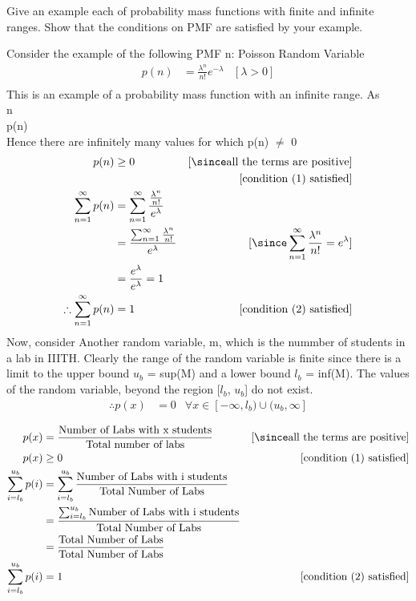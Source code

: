 \begin{Problem}
Give an example each of probability mass functions with finite and infinite ranges. Show that the conditions on PMF are satisfied by your example.
\end{Problem}
\begin{Solution}
Consider the example of the following PMF n: Poisson Random Variable\\
\begin{align*}
    p(n) &= \frac{\lambda^n}{n!}e^{-\lambda} &[\lambda > 0]\\
\end{align*}
This is an example of a probability mass function with an infinite range. As \\ n \rightarrow \infty \\p(n)  \\ Hence there are infinitely many values for which p(n) $\neq$ 0 \\
\begin{align*}
    p(n) & \geq 0 &[\since \text{all the terms are positive}]\\
    &{}&{} [\text{condition (1) satisfied}]\\
    \sum_{n=1}^{\infty}p(n) &= \sum_{n=1}^{\infty}\frac{\frac{\lambda^n}{n!}}{e^{\lambda}}\\
    &= \frac{\sum_{n=1}^{\infty}\frac{\lambda^n}{n!}}{e^{\lambda}} &[\since \sum_{n=1}^{\infty}\frac{\lambda^n}{n!} = e^{\lambda}]\\
    &= \frac{e^{\lambda}}{e^{\lambda}} = 1\\
    \therefore \sum_{n=1}^{\infty}p(n) &= 1 &[\text{condition (2) satisfied}]
\end{align*}
Now, consider Another random variable, m, which is the nummber of students in a lab in IIITH. Clearly the range of the random variable is finite since there is a limit to the upper bound $u_b$ = sup(M) and a lower bound $l_b$ = inf(M). The values of the random variable, beyond the region [$l_b$, $u_b$] do not exist. \\
\begin{align*}
    \therefore p(x) &= 0 &\forall x \in [-\infty, l_b)\cup(u_b, \infty]\\
\end{align*}
\begin{align*}
    p(x) &= \frac{\text{Number of Labs with x students}}{\text{Total number of labs}} &[\since \text{all the terms are positive}] \\
    p(x)& \geq 0 &[\text{condition (1) satisfied}]\\
    \sum_{i=l_b}^{u_b} p(i) &= \sum_{i = l_b}^{u_b}\frac{\text{Number of Labs with i students}}{\text{Total Number of Labs}}\\
    &= \frac{\sum_{i = l_b}^{u_b}\text{Number of Labs with i students}}{\text{Total Number of Labs}} \\
    &= \frac{\text{Total Number of Labs}}{\text{Total Number of Labs}}\\
    \sum_{i=l_b}^{u_b} p(i) &= 1 &[\text{condition (2) satisfied}]
\end{align*}
\end{Solution} 



